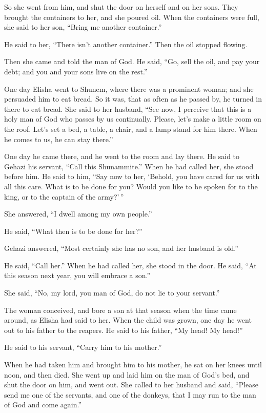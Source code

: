  So she went from him, and shut the door on herself and on
her sons. They brought the containers to her, and she poured oil.
 When the containers were full, she said to her son,
``Bring me another container.''

He said to her, ``There isn't another container.'' Then the oil stopped
flowing.

 Then she came and told the man of God. He said, ``Go,
sell the oil, and pay your debt; and you and your sons live on the
rest.''

 One day Elisha went to Shunem, where there was a
prominent woman; and she persuaded him to eat bread. So it was, that as
often as he passed by, he turned in there to eat bread. 
She said to her husband, ``See now, I perceive that this is a holy man
of God who passes by us continually.  Please, let's make
a little room on the roof. Let's set a bed, a table, a chair, and a lamp
stand for him there. When he comes to us, he can stay there.''

 One day he came there, and he went to the room and lay
there.  He said to Gehazi his servant, ``Call this
Shunammite.'' When he had called her, she stood before him.
 He said to him, ``Say now to her, `Behold, you have
cared for us with all this care. What is to be done for you? Would you
like to be spoken for to the king, or to the captain of the army?'\,''

She answered, ``I dwell among my own people.''

 He said, ``What then is to be done for her?''

Gehazi answered, ``Most certainly she has no son, and her husband is
old.''

 He said, ``Call her.'' When he had called her, she stood
in the door.  He said, ``At this season next year, you
will embrace a son.''

She said, ``No, my lord, you man of God, do not lie to your servant.''

 The woman conceived, and bore a son at that season when
the time came around, as Elisha had said to her.  When
the child was grown, one day he went out to his father to the reapers.
 He said to his father, ``My head! My head!''

He said to his servant, ``Carry him to his mother.''

 When he had taken him and brought him to his mother, he
sat on her knees until noon, and then died.  She went up
and laid him on the man of God's bed, and shut the door on him, and went
out.  She called to her husband and said, ``Please send
me one of the servants, and one of the donkeys, that I may run to the
man of God and come again.''

